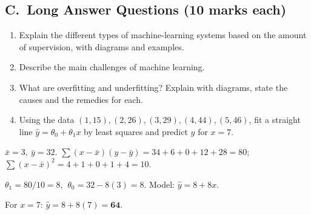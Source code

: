 \subsection*{C.\ Long Answer Questions (10 marks each)}
\begin{enumerate}
  \item Explain the different types of machine-learning systems based on the amount of supervision, with diagrams and examples. 
  \item Describe the main challenges of machine learning. 
  \item What are overfitting and underfitting? Explain with diagrams, state the causes and the remedies for each. 
  \item Using the data $(1,15),(2,26),(3,29),(4,44),(5,46)$, fit a straight line $\hat y=\theta_0+\theta_1x$ by least squares and predict $y$ for $x=7$. 
\end{enumerate}

\begin{modelans}[: C4 (numerical)]
$\bar x=3,\ \bar y=32$. $\sum(x-\bar x)(y-\bar y)=34+6+0+12+28=80$; $\sum(x-\bar x)^2=4+1+0+1+4=10$.\par
$\theta_1=80/10=8$, $\ \theta_0=32-8(3)=8$. Model: $\hat y = 8+8x$.\par
For $x=7$: $\hat y = 8+8(7)=\mathbf{64}$.
\end{modelans}


